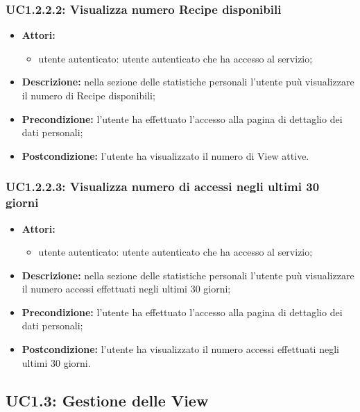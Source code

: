 \subsubsection{UC1.2.2.2: Visualizza numero Recipe disponibili}

\begin{itemize}
	\item \textbf{Attori:}
	\begin{itemize}
		\item utente autenticato: utente autenticato che ha accesso al servizio;
	\end{itemize}
	\item \textbf{Descrizione:} nella sezione delle statistiche personali l'utente puù visualizzare il numero di Recipe disponibili;
	\item \textbf{Precondizione:} l'utente ha effettuato l'accesso alla pagina di dettaglio dei dati personali;
	\item \textbf{Postcondizione:} l'utente ha visualizzato il numero di View attive.
\end{itemize}

\subsubsection{UC1.2.2.3: Visualizza numero di accessi negli ultimi 30 giorni}

\begin{itemize}
	\item \textbf{Attori:}
	\begin{itemize}
		\item utente autenticato: utente autenticato che ha accesso al servizio;
	\end{itemize}
	\item \textbf{Descrizione:} nella sezione delle statistiche personali l'utente puù visualizzare il numero accessi effettuati negli ultimi 30 giorni;
	\item \textbf{Precondizione:} l'utente ha effettuato l'accesso alla pagina di dettaglio dei dati personali;
	\item \textbf{Postcondizione:} l'utente ha visualizzato il numero accessi effettuati negli ultimi 30 giorni.
\end{itemize}

\pagebreak
\subsection{UC1.3: Gestione delle View}

